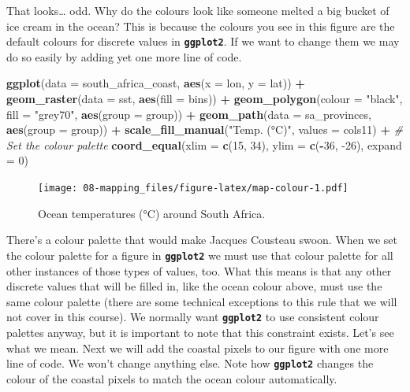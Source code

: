 \documentclass[
]{book}
\newenvironment{Shaded}{\begin{snugshade}}{\end{snugshade}}
\newcommand{\CommentTok}[1]{\textcolor[rgb]{0.56,0.35,0.01}{\textit{#1}}}
\newcommand{\DataTypeTok}[1]{\textcolor[rgb]{0.13,0.29,0.53}{#1}}
\newcommand{\DecValTok}[1]{\textcolor[rgb]{0.00,0.00,0.81}{#1}}
\newcommand{\KeywordTok}[1]{\textcolor[rgb]{0.13,0.29,0.53}{\textbf{#1}}}
\newcommand{\NormalTok}[1]{#1}
\newcommand{\OperatorTok}[1]{\textcolor[rgb]{0.81,0.36,0.00}{\textbf{#1}}}
\newcommand{\StringTok}[1]{\textcolor[rgb]{0.31,0.60,0.02}{#1}}
\begin{document}
That looks\ldots{} odd. Why do the colours look like someone melted a big bucket of ice cream in the ocean? This is because the colours you see in this figure are the default colours for discrete values in \textbf{\texttt{ggplot2}}. If we want to change them we may do so easily by adding yet one more line of code.

\begin{Shaded}
\begin{Highlighting}[]
\KeywordTok{ggplot}\NormalTok{(}\DataTypeTok{data =}\NormalTok{ south\_africa\_coast, }\KeywordTok{aes}\NormalTok{(}\DataTypeTok{x =}\NormalTok{ lon, }\DataTypeTok{y =}\NormalTok{ lat)) }\OperatorTok{+}
\StringTok{  }\KeywordTok{geom\_raster}\NormalTok{(}\DataTypeTok{data =}\NormalTok{ sst, }\KeywordTok{aes}\NormalTok{(}\DataTypeTok{fill =}\NormalTok{ bins)) }\OperatorTok{+}
\StringTok{  }\KeywordTok{geom\_polygon}\NormalTok{(}\DataTypeTok{colour =} \StringTok{"black"}\NormalTok{, }\DataTypeTok{fill =} \StringTok{"grey70"}\NormalTok{, }\KeywordTok{aes}\NormalTok{(}\DataTypeTok{group =}\NormalTok{ group)) }\OperatorTok{+}
\StringTok{  }\KeywordTok{geom\_path}\NormalTok{(}\DataTypeTok{data =}\NormalTok{ sa\_provinces, }\KeywordTok{aes}\NormalTok{(}\DataTypeTok{group =}\NormalTok{ group)) }\OperatorTok{+}
\StringTok{  }\KeywordTok{scale\_fill\_manual}\NormalTok{(}\StringTok{"Temp. (°C)"}\NormalTok{, }\DataTypeTok{values =}\NormalTok{ cols11) }\OperatorTok{+}\StringTok{ }\CommentTok{\# Set the colour palette}
\StringTok{  }\KeywordTok{coord\_equal}\NormalTok{(}\DataTypeTok{xlim =} \KeywordTok{c}\NormalTok{(}\DecValTok{15}\NormalTok{, }\DecValTok{34}\NormalTok{), }\DataTypeTok{ylim =} \KeywordTok{c}\NormalTok{(}\OperatorTok{{-}}\DecValTok{36}\NormalTok{, }\DecValTok{{-}26}\NormalTok{), }\DataTypeTok{expand =} \DecValTok{0}\NormalTok{)}
\end{Highlighting}
\end{Shaded}

\begin{figure}
\centering
\texttt{[image: 08-mapping\_files/figure-latex/map-colour-1.pdf]}
\caption{\label{fig:map-colour}Ocean temperatures (°C) around South Africa.}
\end{figure}

There's a colour palette that would make Jacques Cousteau swoon. When we set the colour palette for a figure in \textbf{\texttt{ggplot2}} we must use that colour palette for all other instances of those types of values, too. What this means is that any other discrete values that will be filled in, like the ocean colour above, must use the same colour palette (there are some technical exceptions to this rule that we will not cover in this course). We normally want \textbf{\texttt{ggplot2}} to use consistent colour palettes anyway, but it is important to note that this constraint exists. Let's see what we mean. Next we will add the coastal pixels to our figure with one more line of code. We won't change anything else. Note how \textbf{\texttt{ggplot2}} changes the colour of the coastal pixels to match the ocean colour automatically.
\end{document}

